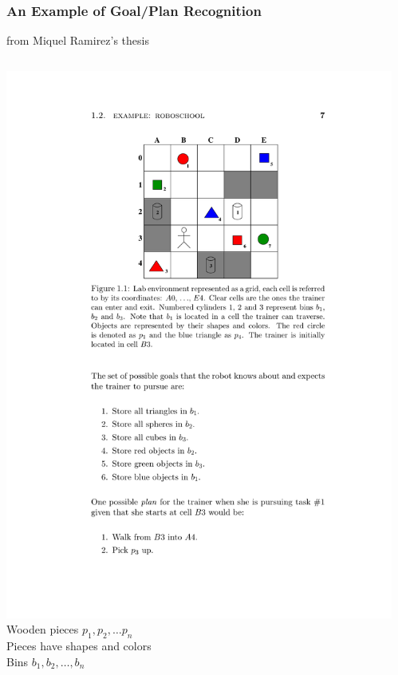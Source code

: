 \documentclass{beamer}
\begin{document}
	\begin{frame}[c]\frametitle{An Example of Goal/Plan Recognition}
		from Miquel Ramirez's thesis
		\begin{columns}
			\begin{column}{0.5\textwidth}
			    \includegraphics[width=.9\textwidth]{fig/roboschool-example.pdf}\\
				Wooden pieces $p_1,p_2, \dots p_n$\\
				Pieces have shapes and colors\\
				Bins $b_1, b_2, \dots, b_n$
			\end{column}
			\begin{column}{0.5\textwidth}
\end{column}
\end{columns}
\end{frame}
\end{document}

